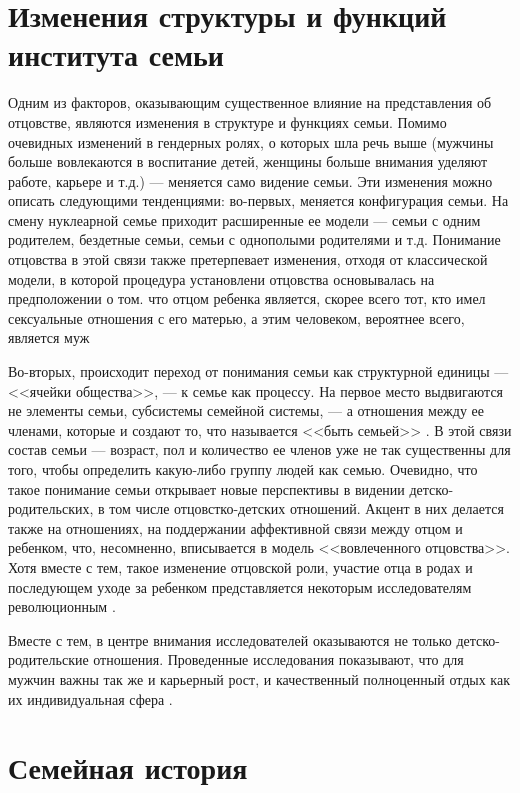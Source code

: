 \documentclass{../../common/thesisbyxetex}
\begin{document}
\section{Изменения структуры и функций института семьи}

Одним из факторов, оказывающим существенное влияние на представления об отцовстве, являются
изменения в структуре и функциях семьи. Помимо очевидных изменений в гендерных ролях, о которых шла
речь выше (мужчины больше вовлекаются в воспитание детей, женщины больше внимания уделяют
работе,
карьере и т.д.) --- меняется само видение семьи. Эти изменения можно описать следующими
тенденциями: во-первых, меняется конфигурация семьи. На смену нуклеарной семье приходит расширенные
ее модели --- семьи с одним родителем, бездетные семьи, семьи с однополыми родителями и т.д.
Понимание отцовства
в этой связи также претерпевает изменения, отходя от классической модели, в которой процедура
установлени отцовства основывалась на предположении о том. что отцом ребенка является, скорее всего
 тот, кто имел сексуальные отношения с его матерью, а этим человеком, вероятнее всего,
является муж \cite[318]{legfat}

Во-вторых, происходит переход от понимания семьи как структурной единицы --- <<ячейки общества>>, 
--- к семье как процессу. На первое место выдвигаются не элементы семьи, субсистемы семейной 
системы, --- а отношения между ее членами, которые и создают то, что называется <<быть семьей>> 
\cite{fam}. В этой связи состав семьи --- возраст, пол и количество ее членов уже не так 
существенны для того, чтобы определить какую-либо группу людей как семью. Очевидно, что такое 
понимание семьи открывает новые перспективы в видении детско-родительских, в том числе 
отцовстко-детских отношений. Акцент в них делается также на отношениях, на поддержании аффективной 
связи между отцом и ребенком, что, несомненно,  вписывается в модель <<вовлеченного отцовства>>. 
Хотя вместе с тем, такое изменение отцовской роли, участие отца в родах и последующем уходе за 
ребенком представляется некоторым исследователям 
революционным \cite[15]{fatpsy}.

Вместе с тем, в центре внимания исследователей оказываются не только детско-родительские отношения. 
Проведенные исследования показывают, что для мужчин важны так же и карьерный рост, и качественный 
полноценный отдых как их индивидуальная сфера \cite{mercoh}.


\section{Семейная история}
\end{document}
